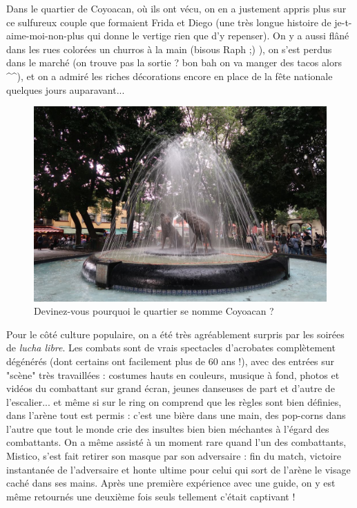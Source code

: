 Dans le quartier de Coyoacan, où ils ont vécu, on en a justement appris
plus sur ce sulfureux couple que formaient Frida et Diego (une très
longue histoire de je-t-aime-moi-non-plus qui donne le vertige rien que
d'y repenser). On y a aussi flâné dans les rues colorées un churros à la
main (bisous Raph ;) ), on s'est perdus dans le marché (on trouve pas la
sortie ? bon bah on va manger des tacos alors \^{}\^{}), et on a admiré
les riches décorations encore en place de la fête nationale quelques
jours auparavant...

\begin{figure}
\centering
\includegraphics{images/20180930_coyoacan.JPG}
\caption{Devinez-vous pourquoi le quartier se nomme Coyoacan ?}
\end{figure}

Pour le côté culture populaire, on a été très agréablement surpris par
les soirées de \emph{lucha libre}. Les combats sont de vrais spectacles
d'acrobates complètement dégénérés (dont certains ont facilement plus de
60 ans !), avec des entrées sur "scène" très travaillées : costumes
hauts en couleurs, musique à fond, photos et vidéos du combattant sur
grand écran, jeunes danseuses de part et d'autre de l'escalier... et
même si sur le ring on comprend que les règles sont bien définies, dans
l'arène tout est permis : c'est une bière dans une main, des pop-corns
dans l'autre que tout le monde crie des insultes bien bien méchantes à
l'égard des combattants. On a même assisté à un moment rare quand l'un
des combattants, Mistico, s'est fait retirer son masque par son
adversaire : fin du match, victoire instantanée de l'adversaire et honte
ultime pour celui qui sort de l'arène le visage caché dans ses mains.
Après une première expérience avec une guide, on y est même retournés
une deuxième fois seuls tellement c'était captivant !

